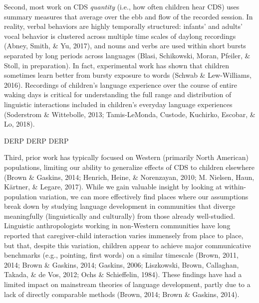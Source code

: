 \documentclass[floatsintext,man]{apa6}
\theoremstyle{definition}
\theoremstyle{definition}
\theoremstyle{definition}
\theoremstyle{remark}
\begin{document}
Second, most work on CDS \emph{quantity} (i.e., how often children hear
CDS) uses summary measures that average over the ebb and flow of the
recorded session. In reality, verbal behaviors are highly temporally
structured: infants' and adults' vocal behavior is clustered across
multiple time scales of daylong recordings (Abney, Smith, \& Yu, 2017),
and nouns and verbs are used within short bursts separated by long
periods across languages (Blasi, Schikowski, Moran, Pfeiler, \& Stoll,
in preparation). In fact, experimental work has shown that children
sometimes learn better from bursty exposure to words (Schwab \&
Lew-Williams, 2016). Recordings of children's language experience over
the course of entire waking days is critical for understanding the full
range and distribution of linguistic interactions included in children's
everyday language experiences (Soderstrom \& Wittebolle, 2013;
Tamis-LeMonda, Custode, Kuchirko, Escobar, \& Lo, 2018).

DERP DERP DERP

Third, prior work has typically focused on Western (primarily North
American) populations, limiting our ability to generalize effects of CDS
to children elsewhere (Brown \& Gaskins, 2014; Henrich, Heine, \&
Norenzayan, 2010; M. Nielsen, Haun, Kärtner, \& Legare, 2017). While we
gain valuable insight by looking at within-population variation, we can
more effectively find places where our assumptions break down by
studying language development in communities that diverge meaningfully
(linguistically and culturally) from those already well-studied.
Linguistic anthropologists working in non-Western communities have long
reported that caregiver-child interaction varies immensely from place to
place, but that, despite this variation, children appear to achieve
major communicative benchmarks (e.g., pointing, first words) on a
similar timescale (Brown, 2011, 2014; Brown \& Gaskins, 2014; Gaskins,
2006; Liszkowski, Brown, Callaghan, Takada, \& de Vos, 2012; Ochs \&
Schieffelin, 1984). These findings have had a limited impact on
mainstream theories of language development, partly due to a lack of
directly comparable methods (Brown, 2014; Brown \& Gaskins, 2014).
\end{document}
